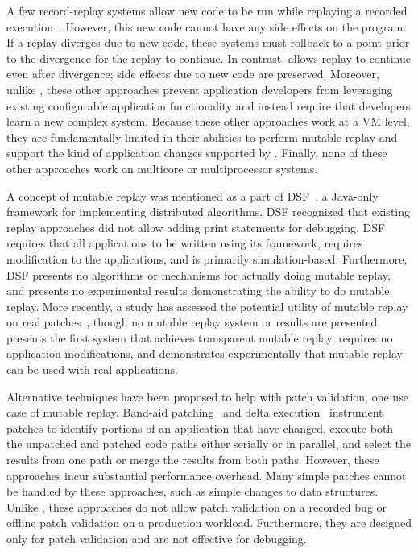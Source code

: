 A few record-replay systems allow new code to be run while replaying a recorded
execution~\cite{intrusions:sosp05,decouple:usenix08}. However, this new code
cannot have any side effects on the program.  If a replay diverges due to new
code, these systems must rollback to a point prior to the divergence for the
replay to continue.  In contrast, {\dora} allows replay to continue even
after divergence; side effects due to new code are preserved.  Moreover, unlike
{\dora}, these other approaches prevent application developers from leveraging existing
configurable application functionality and instead require that developers learn
a new complex system. Because these other approaches work at a VM level, they are
fundamentally limited in their abilities to perform mutable replay and support
the kind of application changes supported by {\dora}. Finally, none of these
other approaches work on multicore or multiprocessor systems.

A concept of mutable replay was mentioned as a part of
DSF~\cite{dsf}, a Java-only framework for implementing distributed 
algorithms. DSF recognized that existing replay approaches did not
allow adding print statements for debugging.  DSF requires that all
applications to be written using its framework, requires modification
to the applications, and is primarily simulation-based. Furthermore, DSF
presents no algorithms or mechanisms for actually doing mutable replay, and
presents no experimental results demonstrating the ability to do mutable
replay.  More recently, a study has assessed the potential utility of
mutable replay on real patches~\cite{mreplay-feas}, though no mutable
replay system or results are presented.
{\dora} presents the first system that achieves transparent mutable replay,
requires no application
modifications, and demonstrates experimentally that
mutable replay can be used with real applications.

Alternative techniques have been proposed to help with patch validation, one
use case of mutable replay.
Band-aid
patching~\cite{bandaid} and delta execution~\cite{delta} instrument patches to
identify portions of an application that have changed, execute both
the unpatched and patched code paths either serially or in parallel,
and select the results from one path or merge the results from both
paths. However, these approaches incur substantial performance overhead.
Many simple patches cannot be handled by these
approaches, such as simple changes to data structures. Unlike {\dora},
these approaches do not allow patch validation on a recorded bug or offline
patch validation on a production workload.
Furthermore, they are designed only for patch validation and are not effective for
debugging.

